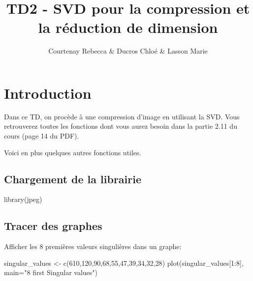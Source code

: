 \documentclass[
]{article}
\title{TD2 - SVD pour la compression et la réduction de dimension}
\author{Courtenay Rebecca \& Ducros Chloé \& Lasson Marie}
\date{}
\newenvironment{Shaded}{\begin{snugshade}}{\end{snugshade}}
\newcommand{\AttributeTok}[1]{\textcolor[rgb]{0.77,0.63,0.00}{#1}}
\newcommand{\DecValTok}[1]{\textcolor[rgb]{0.00,0.00,0.81}{#1}}
\newcommand{\FunctionTok}[1]{\textcolor[rgb]{0.00,0.00,0.00}{#1}}
\newcommand{\NormalTok}[1]{#1}
\newcommand{\OtherTok}[1]{\textcolor[rgb]{0.56,0.35,0.01}{#1}}
\newcommand{\SpecialCharTok}[1]{\textcolor[rgb]{0.00,0.00,0.00}{#1}}
\newcommand{\StringTok}[1]{\textcolor[rgb]{0.31,0.60,0.02}{#1}}
\begin{document}
\maketitle

{
\setcounter{tocdepth}{2}
\tableofcontents
}
\hypertarget{introduction}{%
\section{Introduction}\label{introduction}}

Dans ce TD, on procède à une compression d'image en utilisant la SVD.
Vous retrouverez toutes les fonctions dont vous aurez besoin dans la
partie 2.11 du cours (page 14 du PDF).

Voici en plus quelques autres fonctions utiles.

\hypertarget{chargement-de-la-librairie}{%
\subsection{Chargement de la
librairie}\label{chargement-de-la-librairie}}

\begin{Shaded}
\begin{Highlighting}[]
\FunctionTok{library}\NormalTok{(jpeg)}
\end{Highlighting}
\end{Shaded}

\hypertarget{tracer-des-graphes}{%
\subsection{Tracer des graphes}\label{tracer-des-graphes}}

Afficher les 8 premières valeurs singulières dans un graphe:

\begin{Shaded}
\begin{Highlighting}[]
\NormalTok{singular\_values }\OtherTok{\textless{}{-}} \FunctionTok{c}\NormalTok{(}\DecValTok{610}\NormalTok{,}\DecValTok{120}\NormalTok{,}\DecValTok{90}\NormalTok{,}\DecValTok{68}\NormalTok{,}\DecValTok{55}\NormalTok{,}\DecValTok{47}\NormalTok{,}\DecValTok{39}\NormalTok{,}\DecValTok{34}\NormalTok{,}\DecValTok{32}\NormalTok{,}\DecValTok{28}\NormalTok{)}
\FunctionTok{plot}\NormalTok{(singular\_values[}\DecValTok{1}\SpecialCharTok{:}\DecValTok{8}\NormalTok{], }\AttributeTok{main=}\StringTok{"8 first Singular values"}\NormalTok{)}
\end{Highlighting}
\end{Shaded}
\end{document}
